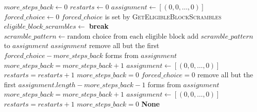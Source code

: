 \documentclass[11pt]{article}
\begin{document}
\begin{algorithm}
  \begin{algorithmic}
   
    \State
    $\mathit{more\_steps\_back} \gets 0$ \State
    $\mathit{restarts} \gets 0$ \State
    $\mathit{assignment} \gets [(0, 0, \dots ,0)]$ \State
    $\mathit{forced\_choice} \gets 0$ \Comment
    $\mathit{forced\_choice}$ is set by
    \textsc{GetEligibleBlockScrambles}
      \State
    $\mathit{eligible\_block\_scrambles} \gets$
    \textbf{break}\Else \State
    $\mathit{scramble\_pattern} \gets \text{random choice from each
      eligible block}$
    \EndIf
     \State add
    $\mathit{scramble\_pattern}$ to $\mathit{assignment}$
    \EndIf {} \State \Return
    $\mathit{assignment}$ \EndIf
    \EndFor
    \State remove all but the first
    $\mathit{forced\_choice} - \mathit{more\_steps\_back}$ forms from
    $\mathit{assignment}$ \State
    $\mathit{more\_steps\_back} = \mathit{more\_steps\_back} + 1$
    \Else\State $\mathit{assignment} \gets [(0, 0, \dots ,0)]$ \State
    $\mathit{restarts} = \mathit{restarts} + 1$ \State
    $\mathit{more\_steps\_back} = 0$
    \EndIf\State
    $\mathit{forced\_choice} = 0$
    \State remove all but the first
    $\mathit{assignment.length} - \mathit{more\_steps\_back} - 1$
    forms from $\mathit{assignment}$ \State
    $\mathit{more\_steps\_back} = \mathit{more\_steps\_back} + 1$
    \Else \State $\mathit{assignment} \gets [(0, 0, \dots ,0)]$ \State
    $\mathit{restarts} = \mathit{restarts} + 1$ \State
    $\mathit{more\_steps\_back} = 0$
    \EndIf
    \EndWhile \State \Return \textbf{None}
    \EndFunction
  \end{algorithmic}
\end{algorithm}
\end{document}
